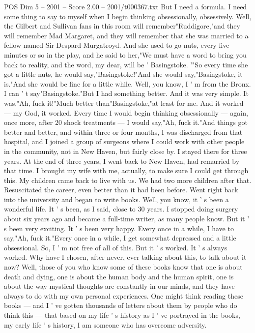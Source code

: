 \begin{textsample}{POS Dim 5 – 2001 – Score 2.00 – 2001/t000367.txt}
But I need a formula.
I need some thing to say to myself when I begin thinking obsessionally, obsessively.
Well, the Gilbert and Sullivan fans in this room will remember"Ruddigore,"and they will remember Mad Margaret, and they will remember that she was married to a fellow named Sir Despard Murgatroyd.
And she used to go nuts, every five minutes or so in the play, and he said to her,"We must have a word to bring you back to reality, and the word, my dear, will be ' Basingstoke. '"So every time she got a little nuts, he would say,"Basingstoke!"And she would say,"Basingstoke, it is."And she would be fine for a little while.
Well, you know, I ' m from the Bronx.
I can ' t say"Basingstoke."But I had something better.
And it was very simple.
It was,"Ah, fuck it!"Much better than"Basingstoke,"at least for me.
And it worked — my God, it worked.
Every time I would begin thinking obsessionally — again, once more, after 20 shock treatments — I would say,"Ah, fuck it."And things got better and better, and within three or four months, I was discharged from that hospital, and I joined a group of surgeons where I could work with other people in the community, not in New Haven, but fairly close by.
I stayed there for three years.
At the end of three years, I went back to New Haven, had remarried by that time.
I brought my wife with me, actually, to make sure I could get through this.
My children came back to live with us.
We had two more children after that.
Resuscitated the career, even better than it had been before.
Went right back into the university and began to write books.
Well, you know, it ' s been a wonderful life.
It ' s been, as I said, close to 30 years.
I stopped doing surgery about six years ago and became a full-time writer, as many people know.
But it ' s been very exciting.
It ' s been very happy.
Every once in a while, I have to say,"Ah, fuck it."Every once in a while, I get somewhat depressed and a little obsessional.
So, I ' m not free of all of this.
But it ' s worked.
It ' s always worked.
Why have I chosen, after never, ever talking about this, to talk about it now?
Well, those of you who know some of these books know that one is about death and dying, one is about the human body and the human spirit, one is about the way mystical thoughts are constantly in our minds, and they have always to do with my own personal experiences.
One might think reading these books — and I ' ve gotten thousands of letters about them by people who do think this — that based on my life ' s history as I ' ve portrayed in the books, my early life ' s history, I am someone who has overcome adversity.

\end{textsample}
